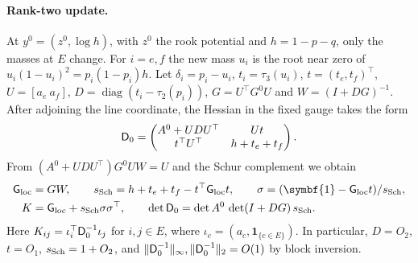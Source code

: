 \paragraph{Rank-two update.}
At $y^0=(z^0,\log h)$, with $z^0$ the rook potential and $h=1-p-q$, only the masses at $E$ change.
For $i=e,f$ the new mass $u_i$ is the root near zero of $u_i(1-u_i)^2=p_i(1-p_i)h$. Let
$\delta_i=p_i-u_i$, $t_i=\tau_3(u_i)$, $t=(t_e,t_f)^\top$, $U=[a_e\ a_f]$,
$D=\operatorname{diag}(t_i-\tau_2(p_i))$, $G=U^\top G^0U$ and $W=(I+DG)^{-1}$. After adjoining the
line coordinate, the Hessian in the fixed gauge takes the form
\[
 \mathsf D_0=\begin{pmatrix} A^0+UDU^\top & Ut\\ t^\top U^\top & h+t_e+t_f\end{pmatrix}.
\]
From $(A^0+UDU^\top)G^0UW=U$ and the Schur complement we obtain
\begin{align*}
 \resloc&=GW,\qquad \schurloc=h+t_e+t_f-t^\top \resloc{}t,\qquad \sigma=(\symbf{1}-\resloc{}t)/\schurloc,\\
 K&=\resloc+\schurloc\sigma\sigma^\top,\qquad \det \hessloc_0=\det A^0\,\det(I+DG)\,\schurloc .
\end{align*}
Here $K_{ij}=\iota_i^\top \mathsf D_0^{-1}\iota_j$ for $i,j\in E$, where
$\iota_c=(a_c,\symbf{1}_{\{c\in E\}})$. In particular, $D=O_2$, $t=O_1$, $s_{\mathrm{Sch}}=1+O_2$, and
$\|\mathsf D_0^{-1}\|_\infty,\|\mathsf D_0^{-1}\|_2=O(1)$ by block inversion.
